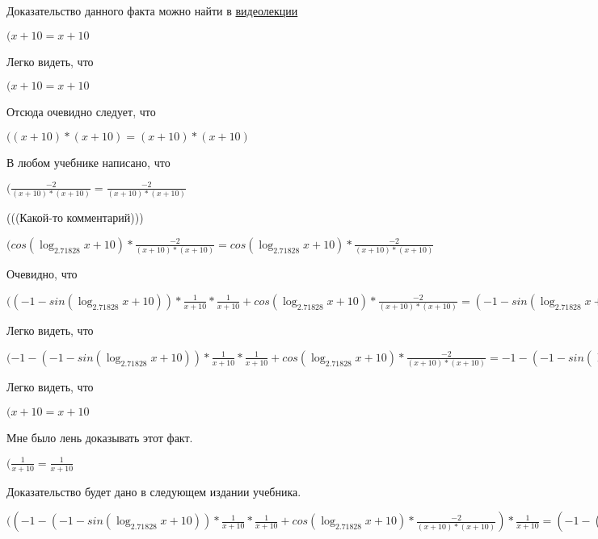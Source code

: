 \documentclass[12pt,a4paper,fleqn]{article}
\theoremstyle{definition}
\begin{document}
Доказательство данного факта можно найти в \href{https://www.youtube.com/watch?v=dQw4w9WgXcQ}{видеолекции}

$( x  +  10  =  x  +  10 $

Легко видеть, что

$( x  +  10  =  x  +  10 $

Отсюда очевидно следует, что

$(( x  +  10 ) * ( x  +  10 ) = ( x  +  10 ) * ( x  +  10 )$

В любом учебнике написано, что

$(\frac{ -2 }{( x  +  10 ) * ( x  +  10 )}
 = \frac{ -2 }{( x  +  10 ) * ( x  +  10 )}
$

(((Какой-то комментарий)))

$(cos(\log_{ 2.71828 }{ x  +  10 }) * \frac{ -2 }{( x  +  10 ) * ( x  +  10 )}
 = cos(\log_{ 2.71828 }{ x  +  10 }) * \frac{ -2 }{( x  +  10 ) * ( x  +  10 )}
$

Очевидно, что

$(( -1  - sin(\log_{ 2.71828 }{ x  +  10 })) * \frac{ 1 }{ x  +  10 }
 * \frac{ 1 }{ x  +  10 }
 + cos(\log_{ 2.71828 }{ x  +  10 }) * \frac{ -2 }{( x  +  10 ) * ( x  +  10 )}
 = ( -1  - sin(\log_{ 2.71828 }{ x  +  10 })) * \frac{ 1 }{ x  +  10 }
 * \frac{ 1 }{ x  +  10 }
 + cos(\log_{ 2.71828 }{ x  +  10 }) * \frac{ -2 }{( x  +  10 ) * ( x  +  10 )}
$

Легко видеть, что

$( -1  - ( -1  - sin(\log_{ 2.71828 }{ x  +  10 })) * \frac{ 1 }{ x  +  10 }
 * \frac{ 1 }{ x  +  10 }
 + cos(\log_{ 2.71828 }{ x  +  10 }) * \frac{ -2 }{( x  +  10 ) * ( x  +  10 )}
 =  -1  - ( -1  - sin(\log_{ 2.71828 }{ x  +  10 })) * \frac{ 1 }{ x  +  10 }
 * \frac{ 1 }{ x  +  10 }
 + cos(\log_{ 2.71828 }{ x  +  10 }) * \frac{ -2 }{( x  +  10 ) * ( x  +  10 )}
$

Легко видеть, что

$( x  +  10  =  x  +  10 $

Мне было лень доказывать этот факт.

$(\frac{ 1 }{ x  +  10 }
 = \frac{ 1 }{ x  +  10 }
$

Доказательство будет дано в следующем издании учебника.

$(( -1  - ( -1  - sin(\log_{ 2.71828 }{ x  +  10 })) * \frac{ 1 }{ x  +  10 }
 * \frac{ 1 }{ x  +  10 }
 + cos(\log_{ 2.71828 }{ x  +  10 }) * \frac{ -2 }{( x  +  10 ) * ( x  +  10 )}
) * \frac{ 1 }{ x  +  10 }
 = ( -1  - ( -1  - sin(\log_{ 2.71828 }{ x  +  10 })) * \frac{ 1 }{ x  +  10 }
 * \frac{ 1 }{ x  +  10 }
 + cos(\log_{ 2.71828 }{ x  +  10 }) * \frac{ -2 }{( x  +  10 ) * ( x  +  10 )}
) * \frac{ 1 }{ x  +  10 }
$
\end{document}
